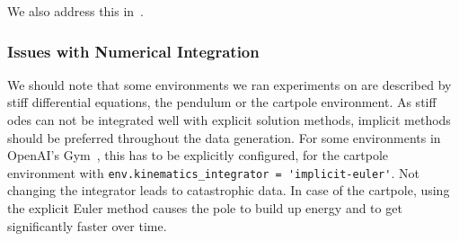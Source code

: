 			We also address this in~.

		\subsubsection{Issues with Numerical Integration}
			\label{subsubsec:integrationProblems}

			We should note that some environments we ran experiments on are described by stiff differential equations, \eg the pendulum or the cartpole environment. As stiff \acp{ode} can not be integrated well with explicit solution methods, implicit methods should be preferred throughout the data generation. For some environments in OpenAI's Gym~\cite{brockmanOpenAIGym2016}, this has to be explicitly configured, \eg for the cartpole environment with \lstinline|env.kinematics_integrator = 'implicit-euler'|. Not changing the integrator leads to catastrophic data. In case of the cartpole, using the explicit Euler method causes the pole to build up energy and to get significantly faster over time.
